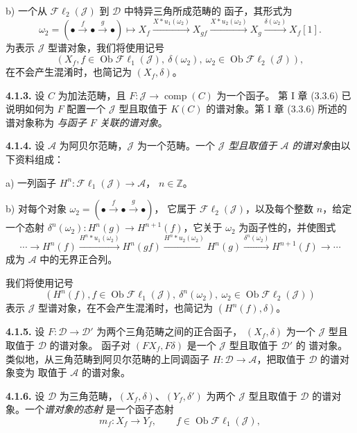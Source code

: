 \clearpage
{}%
\begingroup\small\setlength{\parskip}{0pt}\setlength{\emergencystretch}{1.5em}
b) 一个从 $\mathcal{F}\ell_2(\mathcal J)$ 到 $\mathcal D$ 中特异三角所成范畴的
函子，其形式为
\[
\omega_2=(\mathord\bullet\xrightarrow f\mathord\bullet\xrightarrow g\mathord\bullet)
\longmapsto
X_f\xrightarrow{X*u_1(\omega_2)}X_{gf}
\xrightarrow{X*u_2(\omega_2)}X_g
\xrightarrow{\delta(\omega_2)}X_f[1].
\]
为表示 $\mathcal J$ 型谱对象，我们将使用记号
\[
(X_f, f\in\operatorname{Ob}\mathcal{F}\ell_1(\mathcal J),\
\delta(\omega_2),
\ \omega_2\in\operatorname{Ob}\mathcal{F}\ell_2(\mathcal J)),
\]
在不会产生混淆时，也简记为 $(X_f,\delta)$。

\medskip\noindent\textbf{4.1.3.}\quad
设 $C$ 为加法范畴，且
$F\colon\mathcal J\longrightarrow\operatorname{comp}(C)$ 为一个函子。
第 I 章 (3.3.6) 已说明如何为 $F$ 配置一个 $\mathcal J$ 型且取值于
$K(C)$ 的谱对象。第 I 章 (3.3.6) 所述的谱对象称为
\emph{与函子 $F$ 关联的谱对象}。

\medskip\noindent\textbf{4.1.4.}\quad
设 $\mathcal A$ 为阿贝尔范畴，$\mathcal J$ 为一个范畴。一个
\emph{$\mathcal J$ 型且取值于 $\mathcal A$ 的谱对象}由以下资料组成：

a) 一列函子
$H^n\colon\mathcal{F}\ell_1(\mathcal J)\longrightarrow\mathcal A$，
$n\in\mathbb Z$。

b) 对每个对象
$\omega_2=(\mathord\bullet\xrightarrow f\mathord\bullet\xrightarrow g\mathord\bullet)$，
它属于 $\mathcal{F}\ell_2(\mathcal J)$，以及每个整数 $n$，给定一个态射
$\delta^n(\omega_2)\colon H^n(g)\to H^{n+1}(f)$，它关于 $\omega_2$
为函子性的，并使图式
\[
\cdots\longrightarrow H^n(f)
\xrightarrow{H^n*u_1(\omega_2)}H^n(gf)
\xrightarrow{H^n*u_2(\omega_2)}H^n(g)
\xrightarrow{\delta^n(\omega_2)}H^{n+1}(f)
\longrightarrow\cdots
\]
成为 $\mathcal A$ 中的无界正合列。

我们将使用记号
\[
(H^n(f), f\in\operatorname{Ob}\mathcal{F}\ell_1(\mathcal J),\
\delta^n(\omega_2),
\ \omega_2\in\operatorname{Ob}\mathcal{F}\ell_2(\mathcal J))
\]
表示 $\mathcal J$ 型谱对象，在不会产生混淆时，也简记为
$(H^n(f),\delta)$。

\medskip\noindent\textbf{4.1.5.}\quad
设 $F\colon\mathcal D\to\mathcal D'$ 为两个三角范畴之间的正合函子，
$(X_f,\delta)$ 为一个 $\mathcal J$ 型且取值于 $\mathcal D$ 的谱对象。
函子对 $(FX_f,F\delta)$ 是一个 $\mathcal J$ 型且取值于 $\mathcal D'$ 的
谱对象。类似地，从三角范畴到阿贝尔范畴的上同调函子
$H\colon\mathcal D\to\mathcal A$，把取值于 $\mathcal D$ 的谱对象变为
取值于 $\mathcal A$ 的谱对象。

\medskip\noindent\textbf{4.1.6.}\quad
设 $\mathcal D$ 为三角范畴，$(X_f,\delta)$、$(Y_f,\delta')$ 为两个
$\mathcal J$ 型且取值于 $\mathcal D$ 的谱对象。一个\emph{谱对象的态射}
是一个函子态射
\[
m_f\colon X_f\longrightarrow Y_f,\qquad
f\in\operatorname{Ob}\mathcal{F}\ell_1(\mathcal J),
\]
\endgroup
